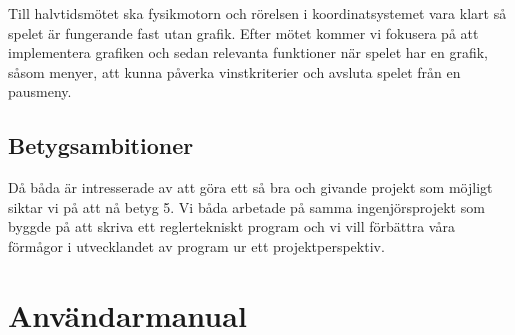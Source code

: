 \documentclass[12pt,a4paper]{article}
\begin{document}
Till halvtidsmötet ska fysikmotorn och rörelsen i koordinatsystemet vara klart så spelet är fungerande fast utan grafik. Efter mötet kommer vi fokusera på att implementera grafiken och sedan relevanta funktioner när spelet har en grafik, såsom menyer, att kunna påverka vinstkriterier och avsluta spelet från en pausmeny.

\subsection{Betygsambitioner}
Då båda är intresserade av att göra ett så bra och givande projekt som möjligt siktar vi på att nå betyg 5. Vi båda arbetade på samma ingenjörsprojekt som byggde på att skriva ett reglertekniskt program och vi vill förbättra våra förmågor i utvecklandet av program ur ett projektperspektiv. 

\section{Användarmanual}
\end{document}
